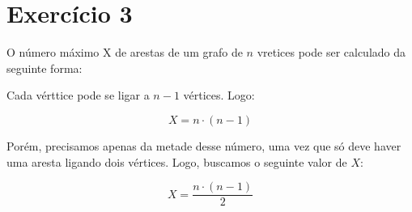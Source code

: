 \section{Exercício 3} 

O número máximo X de arestas de um grafo de $n$ vretices pode ser calculado da seguinte forma:

Cada vérttice pode se ligar a $n - 1$ vértices. Logo:

\begin{equation}
	X = n \cdot (n -1)
\end{equation}

Porém, precisamos apenas da metade desse número, uma vez que só deve haver uma aresta ligando dois vértices.
Logo, buscamos o seguinte valor de $X$:

\begin{equation}
	X = \frac{n \cdot (n - 1)}{2}
\end{equation}

